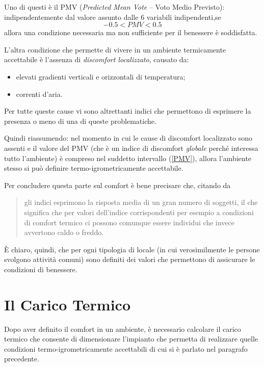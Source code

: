 Uno di questi è il PMV (\emph{Predicted Mean Vote} -- Voto Medio Previsto): indipendentemente dal valore assunto dalle 6 variabili indipendenti,se 
\begin{equation}
\label{PMV}
	-0.5<PMV<0.5
\end{equation}
allora una condizione necessaria ma non sufficiente per il benessere è soddisfatta.

L'altra condizione che permette di vivere in un ambiente termicamente accettabile è l'assenza di \emph{discomfort localizzato}, causato da:
\begin{itemize}
	\item elevati gradienti verticali e orizzontali di temperatura;
	\item correnti d'aria.
\end{itemize}
Per tutte queste cause vi sono altrettanti indici che permettono di esprimere la presenza o meno di una di queste problematiche.

Quindi riassumendo: nel momento in cui le cause di discomfort localizzato sono assenti e il valore del PMV (che è un indice di discomfort \emph{globale} perché interessa tutto l'ambiente) è compreso nel suddetto intervallo (\ref{PMV}), allora l'ambiente stesso si può definire termo-igrometricamente accettabile. 

Per concludere questa parte sul comfort è bene precisare che, citando da \cite[pag 31]{alfano}
\begin{quote}
	gli indici esprimono la risposta media di un gran numero di soggetti, il che significa che per valori dell'indice corrispondenti per esempio a condizioni di comfort termico ci possono comunque essere individui che invece avvertono caldo o freddo.
\end{quote} 
È chiaro, quindi, che per ogni tipologia di locale (in cui verosimilmente le persone svolgono attività comuni) sono definiti dei valori che permettono di assicurare le condizioni di benessere.
\section{Il Carico Termico}
Dopo aver definito il comfort in un ambiente, è necessario calcolare il carico termico che consente di dimensionare l'impianto che permetta di realizzare quelle condizioni termo-igrometricamente accettabili di cui si è parlato nel paragrafo precedente.

